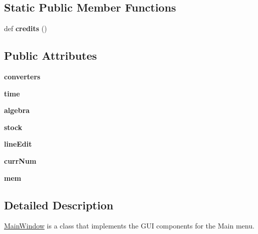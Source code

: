 \subsection*{Static Public Member Functions}
\begin{DoxyCompactItemize}
\item 
\mbox{\label{classmain_1_1_main_window_afbb14c9b37e09c14dff3f018c9a5d65a}} 
def {\bfseries credits} ()
\end{DoxyCompactItemize}
\subsection*{Public Attributes}
\begin{DoxyCompactItemize}
\item 
\mbox{\label{classmain_1_1_main_window_ac90d4b9676d67b44447d3966a32d6417}} 
{\bfseries converters}
\item 
\mbox{\label{classmain_1_1_main_window_af731fd9e6b3a25f31aa3c5184c3af71d}} 
{\bfseries time}
\item 
\mbox{\label{classmain_1_1_main_window_af9037d5b34cba2897b6f89da74e1a95b}} 
{\bfseries algebra}
\item 
\mbox{\label{classmain_1_1_main_window_a584935749a42b7c6f5921beec9a5c100}} 
{\bfseries stock}
\item 
\mbox{\label{classmain_1_1_main_window_aca50353b8be7abd97c74541a81c96bd5}} 
{\bfseries line\+Edit}
\item 
\mbox{\label{classmain_1_1_main_window_a57f464c66e04d42609c0f737431fd568}} 
{\bfseries curr\+Num}
\item 
\mbox{\label{classmain_1_1_main_window_a73657e256ececf837bbed857a1110f33}} 
{\bfseries mem}
\end{DoxyCompactItemize}


\subsection{Detailed Description}
\hyperlink{classmain_1_1_main_window}{Main\+Window} is a class that implements the G\+UI components for the Main menu. 

